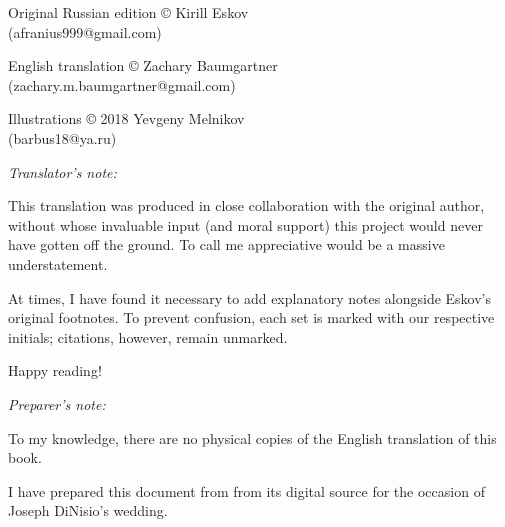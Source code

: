 \vfill

\begin{center}
    Original Russian edition {\oldenglishfont ©} \editionyear{} Kirill Eskov \\ (afranius999@gmail.com)
\end{center}

\begin{center}
    English translation {\oldenglishfont ©} Zachary Baumgartner \\ (zachary.m.baumgartner@gmail.com)
\end{center}

\begin{center}
    Illustrations {\oldenglishfont ©} 2018 Yevgeny Melnikov \\ (barbus18@ya.ru)
\end{center}

\vfill

\begin{center}
    \emph{Translator's note:}
\end{center}

This translation was produced in close collaboration with the original author, without whose invaluable input (and moral support) this project would never have gotten off the ground. To call me appreciative would be a massive understatement.

At times, I have found it necessary to add explanatory notes alongside Eskov's original footnotes. To prevent confusion, each set is marked with our respective initials; citations, however, remain unmarked.

Happy reading!

\begin{center}
    \emph{Preparer's note:}
\end{center}

To my knowledge, there are no physical copies of the English translation of this book. 

I have prepared this document from from its digital source for the occasion of Joseph DiNisio's wedding. 

